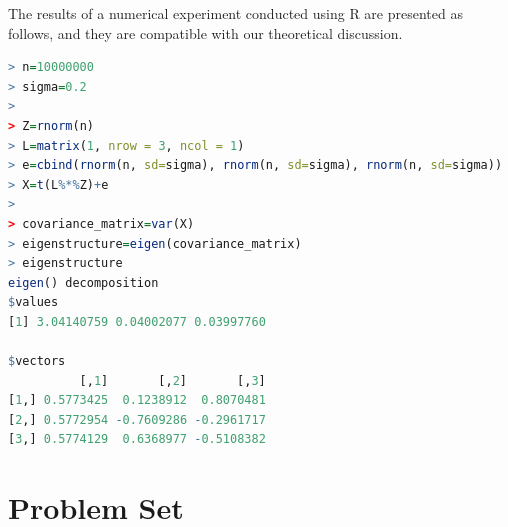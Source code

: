 \documentclass[11pt,letterpaper, leqno]{article}
\numberwithin{equation}{section}
\numberwithin{theorem}{section}
\numberwithin{lemma}{section}
\numberwithin{corollary}{section}
\numberwithin{definition}{section}
\numberwithin{proposition}{section}
\numberwithin{remark}{section}
\numberwithin{example}{section}
\begin{document}
\noindent The results of a numerical experiment conducted using R are presented as follows, and they are compatible with our theoretical discussion.

\begin{lstlisting}[language=R]
> n=10000000
> sigma=0.2
> 
> Z=rnorm(n)
> L=matrix(1, nrow = 3, ncol = 1)
> e=cbind(rnorm(n, sd=sigma), rnorm(n, sd=sigma), rnorm(n, sd=sigma))
> X=t(L%*%Z)+e
> 
> covariance_matrix=var(X)
> eigenstructure=eigen(covariance_matrix)
> eigenstructure
eigen() decomposition
$values
[1] 3.04140759 0.04002077 0.03997760

$vectors
          [,1]       [,2]       [,3]
[1,] 0.5773425  0.1238912  0.8070481
[2,] 0.5772954 -0.7609286 -0.2961717
[3,] 0.5774129  0.6368977 -0.5108382
\end{lstlisting}

\newpage

\section{Problem Set}
\end{document}
